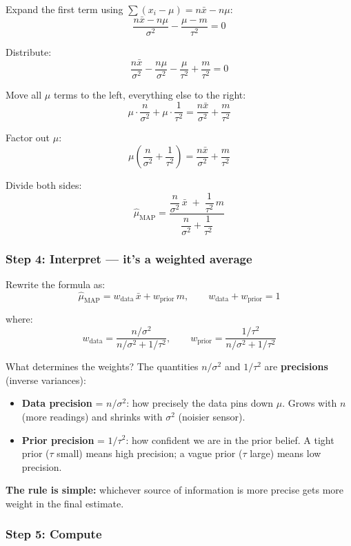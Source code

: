 \documentclass[11pt]{article}
\begin{document}
Expand the first term using $\sum(x_i - \mu) = n\bar{x} - n\mu$:
\[
  \frac{n\bar{x} - n\mu}{\sigma^2} - \frac{\mu - m}{\tau^2} = 0
\]

Distribute:
\[
  \frac{n\bar{x}}{\sigma^2} - \frac{n\mu}{\sigma^2} - \frac{\mu}{\tau^2} + \frac{m}{\tau^2} = 0
\]

Move all $\mu$ terms to the left, everything else to the right:
\[
  \mu\cdot\frac{n}{\sigma^2} + \mu\cdot\frac{1}{\tau^2} = \frac{n\bar{x}}{\sigma^2} + \frac{m}{\tau^2}
\]

Factor out $\mu$:
\[
  \mu\!\left(\frac{n}{\sigma^2} + \frac{1}{\tau^2}\right) = \frac{n\bar{x}}{\sigma^2} + \frac{m}{\tau^2}
\]

Divide both sides:
\[
  \boxed{\hat\mu_{\text{MAP}} = \frac{\dfrac{n}{\sigma^2}\,\bar{x} \;+\; \dfrac{1}{\tau^2}\,m}{\dfrac{n}{\sigma^2} + \dfrac{1}{\tau^2}}}
\]

\subsubsection*{Step 4: Interpret --- it's a weighted average}

Rewrite the formula as:
\[
  \hat\mu_{\text{MAP}} = w_{\text{data}}\,\bar{x} + w_{\text{prior}}\,m, \qquad w_{\text{data}} + w_{\text{prior}} = 1
\]

where:
\[
  w_{\text{data}} = \frac{n/\sigma^2}{n/\sigma^2 + 1/\tau^2}, \qquad
  w_{\text{prior}} = \frac{1/\tau^2}{n/\sigma^2 + 1/\tau^2}
\]

What determines the weights? The quantities $n/\sigma^2$ and $1/\tau^2$ are \textbf{precisions} (inverse variances):

\begin{itemize}
  \item \textbf{Data precision} = $n/\sigma^2$: how precisely the data pins down $\mu$. Grows with $n$ (more readings) and shrinks with $\sigma^2$ (noisier sensor).
  \item \textbf{Prior precision} = $1/\tau^2$: how confident we are in the prior belief. A tight prior ($\tau$ small) means high precision; a vague prior ($\tau$ large) means low precision.
\end{itemize}

\textbf{The rule is simple:} whichever source of information is more precise gets more weight in the final estimate.

\subsubsection*{Step 5: Compute}
\end{document}
